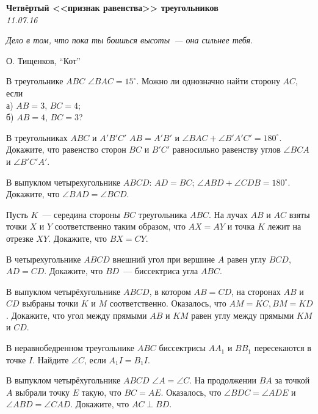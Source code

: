 \renewcommand{\baselinestretch}{0.8}
\parskip

\begin{center}
\textbf{\Large Четвёртый <<признак равенства>> треугольников}\\
\textit{11.07.16}
\end{center}

\epigraph{\it Дело в том, что пока ты боишься высоты~--- она сильнее тебя.}{О. Тищенков, ``Кот''}

\begin{problems}

\item В треугольнике $ABC$  $\angle BAC = 15^{\circ}$. Можно ли однозначно найти сторону $AC$, если\\
а) $AB = 3$, $BC = 4$;\\
б) $AB = 4$, $BC = 3$?

\item В треугольниках $ABC$ и $A'B'C'$  $AB=A'B'$ и $\angle BAC+\angle B'A'C'=180^{\circ}$. Докажите, что равенство сторон $BC$ и $B'C'$ равносильно равенству углов $\angle BCA$ и $\angle B'C'A'$.

\item В выпуклом четырехугольнике $ABCD$: $AD = BC$; $\angle ABD + \angle CDB = 180^{\circ}$. Докажите, что $\angle BAD = \angle BCD$.

\item Пусть $K$~--- середина стороны $BC$ треугольника $ABC$. На лучах $AB$ и $AC$ взяты точки $X$ и $Y$ соответственно таким образом, что $AX = AY$ и точка $K$ лежит на отрезке $XY$. Докажите, что $BX = CY$.

\item  В четырехугольнике $ABCD$ внешний угол при вершине $A$ равен углу $BCD$, $AD=CD$. Докажите, что $BD$~--- биссектриса угла $ABC$.

\item В выпуклом четырёхугольнике $ABCD$, в котором $AB = CD$, на сторонах $AB$ и $CD$ выбраны точки $K$ и $M$ соответственно. Оказалось, что $AM = KC, BM = KD$. Докажите, что угол между прямыми $AB$ и $KM$ равен углу между прямыми $KM$ и $CD$.

\item В неравнобедренном треугольнике $ABC$ биссектрисы $AA_1$ и $BB_1$ пересекаются в точке $I$. Найдите $\angle C$, 
если $A_1I=B_1I$.

\item В выпуклом четырёхугольнике $ABCD$ $\angle A=\angle C$. На продолжении $BA$ за точкой $A$ выбрали точку $E$ такую, что $BC=AE$. Оказалось, что $\angle BDC=\angle ADE$ и $\angle ABD= \angle CAD$. Докажите, что $AC \perp BD$.


\end{problems}
